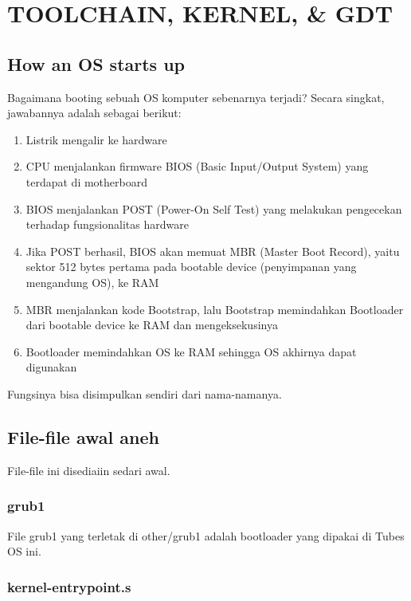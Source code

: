 \chapter{TOOLCHAIN, KERNEL, \& GDT}

\section{How an OS starts up}

Bagaimana booting sebuah OS komputer sebenarnya terjadi? Secara singkat, jawabannya adalah sebagai berikut:

\begin{enumerate}
    \item Listrik mengalir ke hardware
    \item CPU menjalankan firmware BIOS (Basic Input/Output System) yang terdapat di motherboard
    \item BIOS menjalankan POST (Power-On Self Test) yang melakukan pengecekan terhadap fungsionalitas hardware
    \item Jika POST berhasil, BIOS akan memuat MBR (Master Boot Record), yaitu sektor 512 bytes pertama pada bootable device (penyimpanan yang mengandung OS), ke RAM
    \item MBR menjalankan kode Bootstrap, lalu Bootstrap memindahkan Bootloader dari bootable device ke RAM dan mengeksekusinya
    \item Bootloader memindahkan OS ke RAM sehingga OS akhirnya dapat digunakan
\end{enumerate}

Fungsinya bisa disimpulkan sendiri dari nama-namanya.

\section{File-file awal aneh}

File-file ini disediaiin sedari awal.

\subsection{grub1}

File grub1 yang terletak di other/grub1 adalah bootloader yang dipakai di Tubes OS ini.

\subsection{kernel-entrypoint.s}

